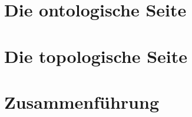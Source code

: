 \documentclass[ twoside,openright,titlepage,numbers=noenddot,%
                headinclude,footinclude,cleardoublepage=empty,abstract=on,
                BCOR=5mm,paper=a4,fontsize=11pt
                ]{scrreprt}
\begin{document}
\frenchspacing
\raggedbottom
{} %
\pagestyle{plain}






\cleardoublepage
\cleardoublepage
\cleardoublepage



\cleardoublepage
\pagestyle{scrheadings}
\cleardoublepage



\part{Die ontologische Seite}





\part{Die topologische Seite}





\part{Zusammenführung}


\end{document}
